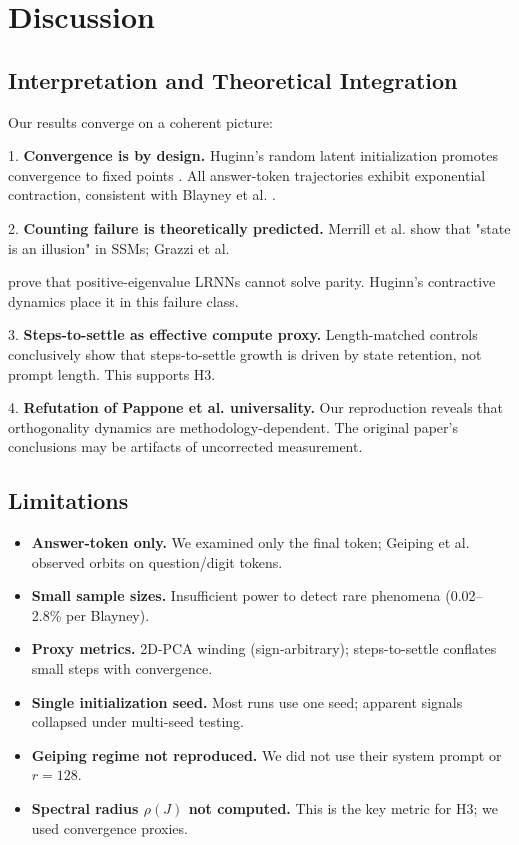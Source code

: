 \documentclass[12pt,a4paper]{article}
\begin{document}
\section{Discussion}

\subsection{Interpretation and Theoretical Integration}

Our results converge on a coherent picture:

1. \textbf{Convergence is by design.} Huginn's random latent initialization promotes convergence to fixed points \cite{geiping2025scaling}. All answer-token trajectories exhibit exponential contraction, consistent with Blayney et al. \cite{blayney2026mechanistic}.

2. \textbf{Counting failure is theoretically predicted.} Merrill et al. \cite{merrill2024illusion} show that "state is an illusion" in SSMs; Grazzi et al.

\cite{grazzi2024unlocking} prove that positive-eigenvalue LRNNs cannot solve parity. Huginn's contractive dynamics place it in this failure class.

3. \textbf{Steps-to-settle as effective compute proxy.} Length-matched controls conclusively show that steps-to-settle growth is driven by state retention, not prompt length. This supports H3.

4. \textbf{Refutation of Pappone et al. universality.} Our reproduction reveals that orthogonality dynamics are methodology-dependent. The original paper's conclusions may be artifacts of uncorrected measurement.

\subsection{Limitations}

\begin{itemize}
    \item \textbf{Answer-token only.} We examined only the final token; Geiping et al. observed orbits on question/digit tokens.
    \item \textbf{Small sample sizes.} Insufficient power to detect rare phenomena (0.02--2.8\% per Blayney).
    \item \textbf{Proxy metrics.} 2D-PCA winding (sign-arbitrary); steps-to-settle conflates small steps with convergence.
    \item \textbf{Single initialization seed.} Most runs use one seed; apparent signals collapsed under multi-seed testing.
    \item \textbf{Geiping regime not reproduced.} We did not use their system prompt or $r=128$.
    \item \textbf{Spectral radius $\rho(J)$ not computed.} This is the key metric for H3; we used convergence proxies.
\end{itemize}
\end{document}

